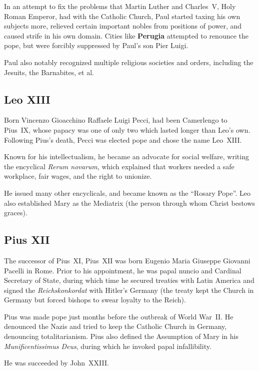In an attempt to fix the problems that Martin Luther and Charles~V, Holy Roman Emperor,
had with the Catholic Church, Paul started taxing his own subjects more,
relieved certain important nobles from positions of power, and caused strife in his own domain.
Cities like \textbf{Perugia} attempted to renounce the pope,
but were forcibly suppressed by Paul's son Pier Luigi.

Paul also notably recognized multiple religious societies and orders,
including the Jesuits, the Barnabites, et al.

\subsection*{Leo XIII}

Born Vincenzo Gioacchino Raffaele Luigi Pecci,
had been Camerlengo to Pius~IX,
whose papacy was one of only two which lasted longer than Leo's own.
Following Pius's death, Pecci was elected pope and chose the name Leo~XIII.

Known for his intellectualism, he became an advocate for social welfare,
writing the encyclical \textit{Rerum novarum},
which explained that workers needed a safe workplace, fair wages, and the right to unionize.

He issued many other encyclicals, and became known as the ``Rosary Pope''.
Leo also established Mary as the Mediatrix (the person through whom Christ bestows graces).

\subsection*{Pius XII}

The successor of Pius~XI,
Pius~XII was born Eugenio Maria Giuseppe Giovanni Pacelli in Rome.
Prior to his appointment, he was papal nuncio and Cardinal Secretary of State,
during which time he secured treaties with Latin America
and signed the \textit{Reichskonkordat} with Hitler's Germany
(the treaty kept the Church in Germany but forced bishops to swear loyalty to the Reich).

Pius was made pope just months before the outbreak of World War~II\@.
He denounced the Nazis and tried to keep the Catholic Church in Germany,
denouncing totalitarianism.
Pius also defined the Assumption of Mary in his \textit{Munificentissimus Deus},
during which he invoked papal infallibility.

He was succeeded by John~XXIII\@.
